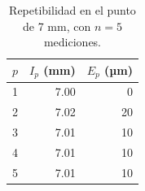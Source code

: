 \begin{table}[H]
\centering
\caption{Repetibilidad en el punto de 7 mm, con $n=5$ mediciones.}
\label{tab:reloj-repetibilidad}
\begin{tabular}{rrr}
\toprule
$p$ & $I_p$ (mm) & $E_p$ (µm) \\
\midrule
1 & 7.00 & 0 \\
2 & 7.02 & 20 \\
3 & 7.01 & 10 \\
4 & 7.01 & 10 \\
5 & 7.01 & 10 \\
\bottomrule
\end{tabular}
\end{table}

